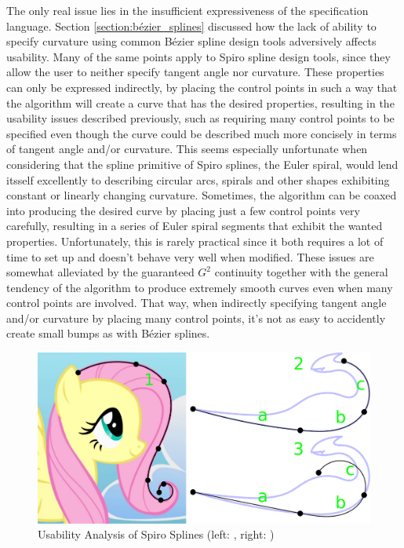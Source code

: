 \documentclass[a4paper]{article}
\begin{document}
				The only real issue lies in the insufficient expressiveness of the specification language. Section \ref{section:bézier_splines} discussed how the lack of ability to specify curvature using common Bézier spline design tools adversively affects usability. Many of the same points apply to Spiro spline design tools, since they allow the user to neither specify tangent angle nor curvature. These properties can only be expressed indirectly, by placing the control points in such a way that the algorithm will create a curve that has the desired properties, resulting in the usability issues described previously, such as requiring many control points to be specified even though the curve could be described much more concisely in terms of tangent angle and/or curvature. This seems especially unfortunate when considering that the spline primitive of Spiro splines, the Euler spiral, would lend itsself excellently to describing circular arcs, spirals and other shapes exhibiting constant or linearly changing curvature. Sometimes, the algorithm can be coaxed into producing the desired curve by placing just a few control points very carefully, resulting in a series of Euler spiral segments that exhibit the wanted properties. Unfortunately, this is rarely practical since it both requires a lot of time to set up and doesn't behave very well when modified. These issues are somewhat alleviated by the guaranteed \(G^2\) continuity together with the general tendency of the algorithm to produce extremely smooth curves even when many control points are involved. That way, when indirectly specifying tangent angle and/or curvature by placing many control points, it's not as easy to accidently create small bumps as with Bézier splines.

				\begin{figure}[htb]
					\centering
					\includegraphics[width=\textwidth]{../resources/usability_spiro.pdf}
					\caption{Usability Analysis of Spiro Splines (left: \cite{Fluttershy}, right: \cite{Lugia})}
					\label{figure:usability_spiro}
				\end{figure}
\end{document}
